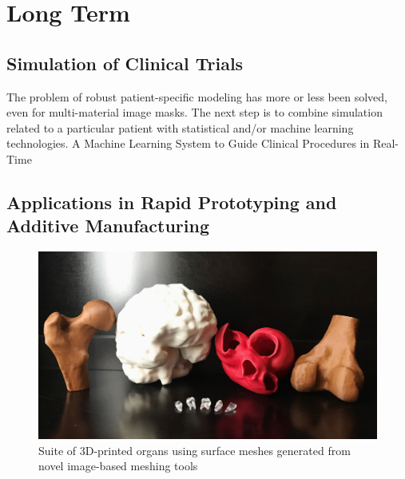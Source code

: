 \section{Long Term}
\label{Long Term}

\subsection{Simulation of Clinical Trials}
\label{Simulation of Clinical Trials}
The problem of robust patient-specific modeling has more or less been solved, even for multi-material image masks. The next step is to combine simulation related to a particular patient with statistical and/or machine learning technologies. 
A Machine Learning System to Guide Clinical Procedures in Real-Time

\subsection[Applications in Rapid Prototyping and Additive Manufacturing]{\texorpdfstring{Applications in Rapid Prototyping and Additive \newline Manufacturing}{Applications in Rapid Prototyping and Additive \newline Manufacturing}}
\label{Applications in Rapid Prototyping and Additive Manufacturing}

\cite{fda3_2016}

\begin{figure}
\centering
		\includegraphics[width=1.0\textwidth]{media/6-3dprint/3dprint.jpg}
%
\caption{Suite of 3D-printed organs using surface meshes generated from novel image-based meshing tools}
\label{fig:3dprint}
\end{figure}


